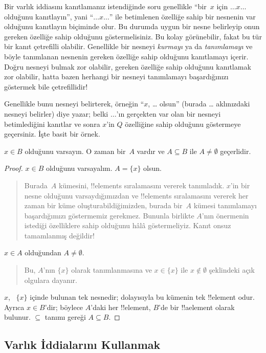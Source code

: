 Bir varlık iddiasını kanıtlamanız istendiğinde soru genellikle
``bir~$x$ için $\dots x \dots$ olduğunu kanıtlayın'', yani
``$\dots x \dots$'' ile betimlenen özelliğe sahip bir nesnenin var
olduğunu kanıtlayın biçiminde olur. Bu durumda uygun bir nesne belirleyip
onun gereken özelliğe sahip olduğunu göstermelisiniz. Bu kolay
görünebilir, fakat bu tür bir kanıt çetrefilli olabilir. Genellikle bir
nesneyi \emph{kurmayı} ya da \emph{tanımlamayı} ve böyle tanımlanan
nesnenin gereken özelliğe sahip olduğunu kanıtlamayı içerir. Doğru
nesneyi bulmak zor olabilir, gereken özelliğe sahip olduğunu kanıtlamak
zor olabilir, hatta bazen herhangi bir nesneyi tanımlamayı başardığınızı
göstermek bile çetrefillidir!{}

Genellikle bunu nesneyi belirterek, örneğin ``$x$, \dots{} olsun''
(burada \dots{} aklınızdaki nesneyi belirler) diye yazar; belki
$\dots$'ın gerçekten var olan bir nesneyi betimlediğini kanıtlar ve sonra
$x$'in $Q$ özelliğine sahip olduğunu göstermeye geçersiniz. İşte basit
bir örnek.

\begin{prop}
  $x \in B$ olduğunu varsayın. O zaman bir~$A$ vardır ve $A \subseteq B$
  ile $A \neq \emptyset$ geçerlidir.
\end{prop}

\begin{proof}
  $x \in B$ olduğunu varsayalım. $A = \{x\}$ olsun.
  \begin{quote}
    Burada~$A$ kümesini, !!{element}s sıralamasını vererek tanımladık. $x$'in bir
    nesne olduğunu varsaydığımızdan ve !!{element}s sıralamasını vererek her
    zaman bir küme oluşturabildiğimizden, burada bir~$A$ kümesi
    tanımlamayı başardığımızı göstermemiz gerekmez. Bununla birlikte
    $A$'nın önermenin istediği özelliklere sahip olduğunu hâlâ
    göstermeliyiz. Kanıt onsuz tamamlanmış değildir!{}
  \end{quote}
  $x \in A$ olduğundan $A \neq \emptyset$.
  \begin{quote}
    Bu, $A$'nın $\{x\}$ olarak tanımlanmasına ve $x \in \{x\}$ ile $x
    \notin \emptyset$ şeklindeki açık olgulara dayanır.
  \end{quote}
  $x$, ~$\{x\}$ içinde bulunan tek nesnedir; dolayısıyla bu kümenin tek
  !!{element} odur. Ayrıca $x \in B$'dir; böylece $A$'daki her
  !!{element}, $B$'de bir !!a{element} olarak
  bulunur. $\subseteq$
  tanımı gereği $A \subseteq B$.
\end{proof}

\subsection{Varlık İddialarını Kullanmak}


